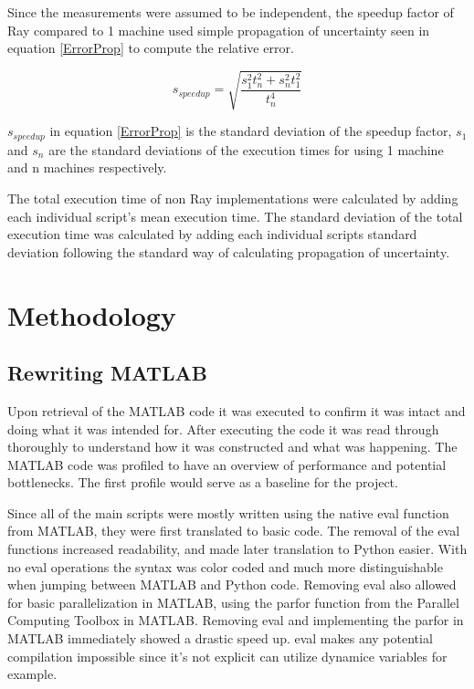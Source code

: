 \documentclass[12pt, a4paper]{article}
\begin{document}
Since the measurements were assumed to be independent, the speedup factor of Ray compared to 1 machine used simple propagation of uncertainty seen in equation \eqref{ErrorProp} to compute the relative error.

\begin{equation}\label{ErrorProp}
    s_{speedup} = \sqrt{\frac{s_{1}^2t_n^2 + s_{n}^2t_1^2}{t_n^4}}
\end{equation}

$s_{speedup}$ in equation \eqref{ErrorProp} is the standard deviation of the speedup factor, $s_1$ and $s_n$ are the standard deviations of the execution times for using 1 machine and n machines respectively.

The total execution time of non Ray implementations were calculated by adding each individual script's mean execution time.
The standard deviation of the total execution time was calculated by adding each individual scripts standard deviation following the standard way of calculating propagation of uncertainty.

\section{Methodology}

\subsection{Rewriting MATLAB}

Upon retrieval of the MATLAB code it was executed to confirm it was intact and doing what it was intended for. 
After executing the code it was read through thoroughly to understand how it was constructed and what was happening.
The MATLAB code was profiled to have an overview of performance and potential bottlenecks.
The first profile would serve as a baseline for the project.

Since all of the main scripts were mostly written using the native eval function from MATLAB, they were first translated to basic code. 
The removal of the eval functions increased readability, and made later translation to Python easier. With no eval operations the syntax was color coded and much more distinguishable when jumping between MATLAB and Python code.
Removing eval also allowed for basic parallelization in MATLAB, using the parfor function from the Parallel Computing Toolbox in MATLAB.
Removing eval and implementing the parfor in MATLAB immediately showed a drastic speed up. 
eval makes any potential compilation impossible since it's not explicit can utilize dynamice variables for example.
\end{document}
